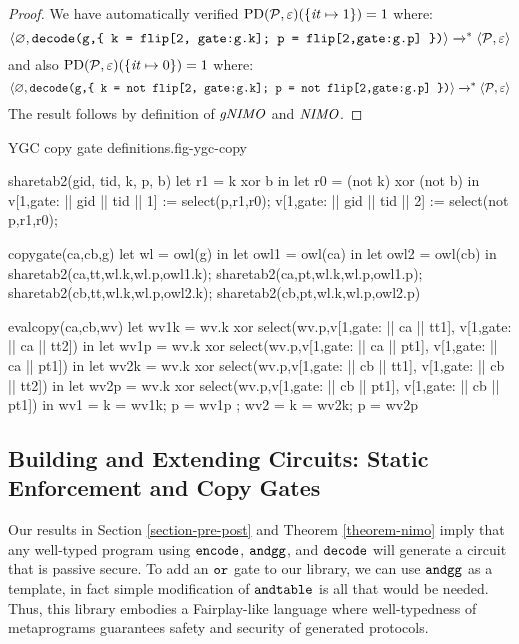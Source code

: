 \begin{proof}
  We have automatically verified $
  \mathrm{PD}(\mathcal{P},\varepsilon)(\{ \mathit{it} \mapsto 1 \}) = 1$ where:
  $$\langle \varnothing,\texttt{decode(g,\{ k = flip[2, gate:g.k]; p = flip[2,gate:g.p] \})} \rangle
    \xrightarrow{}^{*} \langle \mathcal{P},\varepsilon \rangle$$
    and also $
  \mathrm{PD}(\mathcal{P},\varepsilon)(\{ \mathit{it} \mapsto 0 \}) = 1$ where:
  $$\langle \varnothing,\texttt{decode(g,\{ k = not flip[2, gate:g.k]; p = not flip[2,gate:g.p] \})} \rangle
    \xrightarrow{}^{*} \langle \mathcal{P},\varepsilon \rangle$$
  The result follows by definition of $\mathit{gNIMO}$ and $\mathit{NIMO}$.
\end{proof}


\begin{fpfig}[t]{YGC copy gate definitions.}{fig-ygc-copy}
  {\footnotesize
    \begin{verbatimtab}
      sharetab2(gid, tid, k, p, b)
      {
        let r1 = k xor b in
        let r0 = (not k) xor (not b) in
        v[1,gate: || gid || tid || 1] := select(p,r1,r0);
        v[1,gate: || gid || tid || 2] := select(not p,r1,r0);
      }
      
      copygate(ca,cb,g)
      {
        let wl = owl(g) in
        let owl1 = owl(ca) in
        let owl2 = owl(cb) in
        sharetab2(ca,tt,wl.k,wl.p,owl1.k); sharetab2(ca,pt,wl.k,wl.p,owl1.p);
        sharetab2(cb,tt,wl.k,wl.p,owl2.k); sharetab2(cb,pt,wl.k,wl.p,owl2.p)
      }
      
      evalcopy(ca,cb,wv)
      {
        let wv1k = wv.k xor select(wv.p,v[1,gate: || ca || tt1], v[1,gate: || ca || tt2]) in
        let wv1p = wv.k xor select(wv.p,v[1,gate: || ca || pt1], v[1,gate: || ca || pt1]) in
        let wv2k = wv.k xor select(wv.p,v[1,gate: || cb || tt1], v[1,gate: || cb || tt2]) in
        let wv2p = wv.k xor select(wv.p,v[1,gate: || cb || pt1], v[1,gate: || cb || pt1]) in
        { wv1 = { k = wv1k; p = wv1p }; wv2 = { k = wv2k; p = wv2p } }  
      }  \end{verbatimtab}
  }
\end{fpfig}

\subsection{Building and Extending Circuits: Static Enforcement and Copy Gates}

Our results in Section \ref{section-pre-post} and Theorem
\ref{theorem-nimo} imply that any well-typed program using
$\texttt{encode}$, $\texttt{andgg}$, and $\texttt{decode}$ will generate a
circuit that is passive secure. To add an $\texttt{or}$ gate to our
library, we can use $\texttt{andgg}$ as a template, in fact simple
modification of $\texttt{andtable}$ is all that would be needed. Thus,
this library embodies a Fairplay-like language where well-typedness
of metaprograms guarantees safety and security of generated protocols.

